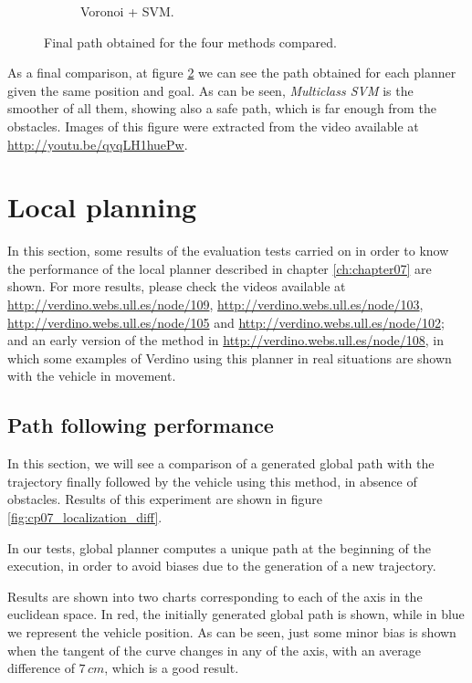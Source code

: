 \begin{figure}[h!]
\begin{subfigure}[b]{0.45\textwidth}
	  \caption{Voronoi + \ac{SVM}.}
	  \label{fig:cp06_voronoi_svm_final}
  \end{subfigure}
  \caption{Final path obtained for the four methods compared.}\label{fig:cp06_final_path_comparison}
\end{figure}

As a final comparison, at figure \ref{fig:cp06_final_path_comparison} we can see the path obtained for each planner given the same position and goal. As can be seen, \textit{Multiclass \ac{SVM}} is the smoother of all them, showing also a safe path, which is far enough from the obstacles. Images of this figure were extracted from the video available at \url{http://youtu.be/qyqLH1huePw}.

\graphicspath{{./images/chapter07/bmps/}{./images/chapter07/vects/}{./images/chapter07/}}

\section{Local planning}\label{ch:chapter07_02}

In this section, some results of the evaluation tests carried on in order to know the performance of the local planner described in chapter \ref{ch:chapter07} are shown. For more results, please check the videos available at \url{http://verdino.webs.ull.es/node/109}, \url{http://verdino.webs.ull.es/node/103}, \url{http://verdino.webs.ull.es/node/105} and \url{http://verdino.webs.ull.es/node/102}; and an early version of the method in \url{http://verdino.webs.ull.es/node/108}, in which some examples of Verdino using this planner in real situations are shown with the vehicle in movement.

\subsection{Path following performance}\label{ch:chapter07_02_01}

In this section, we will see a comparison of a generated global path with the trajectory finally followed by the vehicle using this method, in absence of obstacles. Results of this experiment are shown in figure \ref{fig:cp07_localization_diff}.

In our tests, global planner computes a unique path at the beginning of the execution, in order to avoid biases due to the generation of a new trajectory.

Results are shown into two charts corresponding to each of the axis in the euclidean space. In red, the initially generated global path is shown, while in blue we represent the vehicle position. As can be seen, just some minor bias is shown when the tangent of the curve changes in any of the axis, with an average difference of $7\,cm$, which is a good result.

